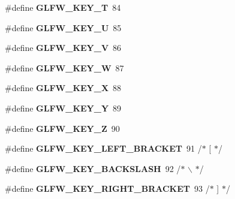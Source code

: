 \begin{DoxyCompactItemize}
\item 
\hypertarget{group__keys_ga90e0560422ec7a30e7f3f375bc9f37f9}{\#define {\bfseries \-G\-L\-F\-W\-\_\-\-K\-E\-Y\-\_\-\-T}~84}\label{group__keys_ga90e0560422ec7a30e7f3f375bc9f37f9}

\item 
\hypertarget{group__keys_gacad52f3bf7d378fc0ffa72a76769256d}{\#define {\bfseries \-G\-L\-F\-W\-\_\-\-K\-E\-Y\-\_\-\-U}~85}\label{group__keys_gacad52f3bf7d378fc0ffa72a76769256d}

\item 
\hypertarget{group__keys_ga22c7763899ecf7788862e5f90eacce6b}{\#define {\bfseries \-G\-L\-F\-W\-\_\-\-K\-E\-Y\-\_\-\-V}~86}\label{group__keys_ga22c7763899ecf7788862e5f90eacce6b}

\item 
\hypertarget{group__keys_gaa06a712e6202661fc03da5bdb7b6e545}{\#define {\bfseries \-G\-L\-F\-W\-\_\-\-K\-E\-Y\-\_\-\-W}~87}\label{group__keys_gaa06a712e6202661fc03da5bdb7b6e545}

\item 
\hypertarget{group__keys_gac1c42c0bf4192cea713c55598b06b744}{\#define {\bfseries \-G\-L\-F\-W\-\_\-\-K\-E\-Y\-\_\-\-X}~88}\label{group__keys_gac1c42c0bf4192cea713c55598b06b744}

\item 
\hypertarget{group__keys_gafd9f115a549effdf8e372a787c360313}{\#define {\bfseries \-G\-L\-F\-W\-\_\-\-K\-E\-Y\-\_\-\-Y}~89}\label{group__keys_gafd9f115a549effdf8e372a787c360313}

\item 
\hypertarget{group__keys_gac489e208c26afda8d4938ed88718760a}{\#define {\bfseries \-G\-L\-F\-W\-\_\-\-K\-E\-Y\-\_\-\-Z}~90}\label{group__keys_gac489e208c26afda8d4938ed88718760a}

\item 
\hypertarget{group__keys_gad1c8d9adac53925276ecb1d592511d8a}{\#define {\bfseries \-G\-L\-F\-W\-\_\-\-K\-E\-Y\-\_\-\-L\-E\-F\-T\-\_\-\-B\-R\-A\-C\-K\-E\-T}~91  /$\ast$ \mbox{[} $\ast$/}\label{group__keys_gad1c8d9adac53925276ecb1d592511d8a}

\item 
\hypertarget{group__keys_gab8155ea99d1ab27ff56f24f8dc73f8d1}{\#define {\bfseries \-G\-L\-F\-W\-\_\-\-K\-E\-Y\-\_\-\-B\-A\-C\-K\-S\-L\-A\-S\-H}~92  /$\ast$ $\backslash$ $\ast$/}\label{group__keys_gab8155ea99d1ab27ff56f24f8dc73f8d1}

\item 
\hypertarget{group__keys_ga86ef225fd6a66404caae71044cdd58d8}{\#define {\bfseries \-G\-L\-F\-W\-\_\-\-K\-E\-Y\-\_\-\-R\-I\-G\-H\-T\-\_\-\-B\-R\-A\-C\-K\-E\-T}~93  /$\ast$ \mbox{]} $\ast$/}\label{group__keys_ga86ef225fd6a66404caae71044cdd58d8}


\end{DoxyCompactItemize}
